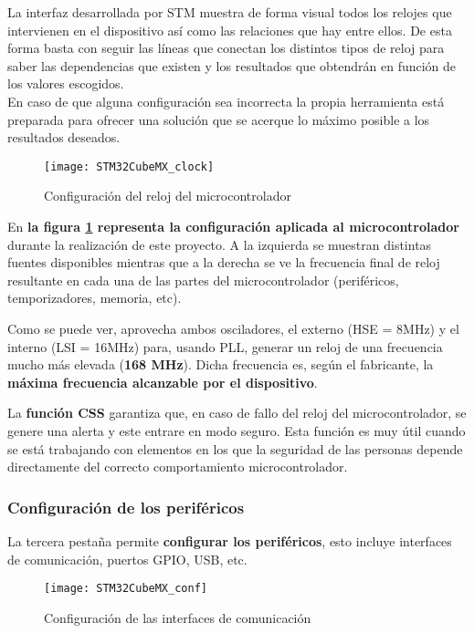 La interfaz desarrollada por STM muestra de forma visual todos los relojes que intervienen en el dispositivo así como las relaciones que hay entre ellos. De esta forma basta con seguir las líneas que conectan los distintos tipos de reloj para saber las dependencias que existen y los resultados que obtendrán en función de los valores escogidos.
\\En caso de que alguna configuración sea incorrecta la propia herramienta está preparada para ofrecer una solución que se acerque lo máximo posible a los resultados deseados.

\begin{figure} [h]
    \centering
    \texttt{[image: STM32CubeMX\_clock]}
    \caption{Configuración del reloj del microcontrolador}
    \label{fig:STM32CubeMX_clock}
\end{figure}

En \textbf{la figura \ref{fig:STM32CubeMX_clock} representa la configuración aplicada al microcontrolador} durante la realización de este proyecto. A la izquierda se muestran distintas fuentes disponibles mientras que a la derecha se ve la frecuencia final de reloj resultante en cada una de las partes del microcontrolador (periféricos, temporizadores, memoria, etc).

Como se puede ver, aprovecha ambos osciladores, el externo (\acrshort{HSE} = 8MHz) y el interno (\acrshort{LSI} = 16MHz) para, usando \acrshort{PLL}, generar un reloj de una frecuencia mucho más elevada (\textbf{168 MHz}). Dicha frecuencia es, según el fabricante, la \textbf{máxima frecuencia alcanzable por el dispositivo}.

La \textbf{función \acrshort{CSS}} garantiza que, en caso de fallo del reloj del microcontrolador, se genere una alerta y este entrare en modo seguro. Esta función es muy útil cuando se está trabajando con elementos en los que la seguridad de las personas depende directamente del correcto comportamiento microcontrolador.

\clearpage

\subsubsection{Configuración de los periféricos\label{sec:Configuracion_micro_com}}

La tercera pestaña permite \textbf{configurar los periféricos}, esto incluye interfaces de comunicación, puertos GPIO, USB, etc.

\begin{figure} [h]
    \centering
    \texttt{[image: STM32CubeMX\_conf]}
    \caption{Configuración de las interfaces de comunicación}
    \label{fig:STM32CubeMX_conf}
\end{figure}

